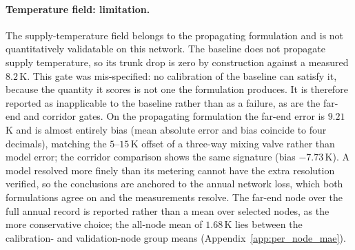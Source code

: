 \paragraph{Temperature field: limitation.}
The supply-temperature field belongs to the propagating formulation and is not quantitatively
validatable on this network. The baseline does not propagate supply temperature, so its trunk
drop is zero by construction against a measured $8.2$\,K. This gate was mis-specified: no
calibration of the baseline can satisfy it, because the quantity it scores is not one the
formulation produces. It is therefore reported as inapplicable to the baseline rather than as a
failure, as are the far-end and corridor gates. On the propagating formulation the far-end error
is $9.21$\,K and is almost entirely bias (mean absolute error and bias coincide to four
decimals), matching the $5$--$15$\,K offset of a three-way mixing valve rather than model error;
the corridor comparison shows the same signature (bias $-7.73$\,K). A model resolved more finely
than its metering cannot have the extra resolution verified, so the conclusions are anchored to
the annual network loss, which both formulations agree on and the measurements resolve. The
far-end node over the full annual record is reported rather than a mean over selected nodes, as
the more conservative choice; the all-node mean of $1.68$\,K lies between the calibration- and
validation-node group means (Appendix~\ref{app:per_node_mae}).

